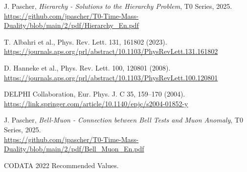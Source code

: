 \documentclass[12pt,a4paper]{article}
\theoremstyle{definition}
\begin{document}
\begin{thebibliography}{99}
		 J. Pascher, \textit{Hierarchy - Solutions to the Hierarchy Problem}, T0 Series, 2025. \\
		\url{https://github.com/jpascher/T0-Time-Mass-Duality/blob/main/2/pdf/Hierarchy_En.pdf}
		
		 T. Albahri et al., Phys. Rev. Lett. 131, 161802 (2023). \\
		\url{https://journals.aps.org/prl/abstract/10.1103/PhysRevLett.131.161802}
		
		 D. Hanneke et al., Phys. Rev. Lett. 100, 120801 (2008). \\
		\url{https://journals.aps.org/prl/abstract/10.1103/PhysRevLett.100.120801}
		
		 DELPHI Collaboration, Eur. Phys. J. C 35, 159--170 (2004). \\
		\url{https://link.springer.com/article/10.1140/epjc/s2004-01852-y}
		
		 J. Pascher, \textit{Bell-Muon - Connection between Bell Tests and Muon Anomaly}, T0 Series, 2025. \\
		\url{https://github.com/jpascher/T0-Time-Mass-Duality/blob/main/2/pdf/Bell_Muon_En.pdf}
		
		 CODATA 2022 Recommended Values.
	\end{thebibliography}
	
\end{document}
